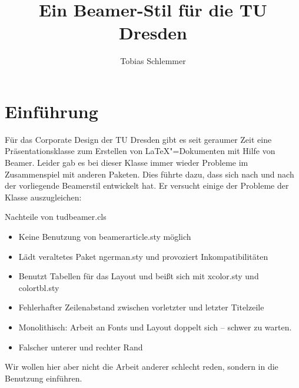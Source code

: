 \usepackage{xcolor}
\usepackage{listings}
\title{Ein Beamer-Stil für die TU Dresden}
\author{Tobias Schlemmer}

\maketitle
\frame{\tableofcontents}
\section{Einführung}
\begin{frame}

Für das Corporate Design der TU Dresden gibt es seit geraumer Zeit eine Präsentationsklasse zum Erstellen von \LaTeX{}"=Dokumenten mit Hilfe von Beamer. Leider gab es bei dieser Klasse immer wieder Probleme im Zusammenspiel mit anderen Paketen. Dies führte dazu, dass sich nach und nach der vorliegende Beamerstil entwickelt hat. Er versucht einige der Probleme der Klasse auszugleichen:
  \begin{block}{Nachteile von tudbeamer.cls}
    \begin{itemize}
    \item Keine Benutzung von beamerarticle.sty möglich
    \item Lädt veraltetes Paket ngerman.sty und provoziert Inkompatibilitäten
    \item Benutzt Tabellen für das Layout und beißt sich mit xcolor.sty und colortbl.sty
    \item Fehlerhafter Zeilenabstand zwischen vorletzter und letzter Titelzeile
    \item Monolithisch: Arbeit an Fonts und Layout doppelt sich – schwer zu warten.
    \item Falscher unterer und rechter Rand
    \end{itemize}
  \end{block}
  Wir wollen hier aber nicht die Arbeit anderer schlecht reden, sondern in die Benutzung einführen.
\end{frame}

